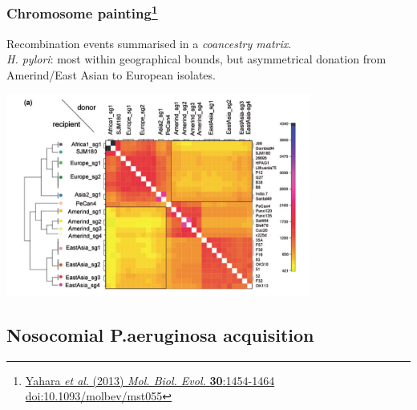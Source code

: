 \begin{frame}
  \frametitle{Chromosome painting\footnote{\tiny{\href{http://dx.doi.org/10.1093/molbev/mst055}{Yahara \textit{et al}. (2013) \textit{Mol. Biol. Evol.} \textbf{30}:1454-1464 doi:10.1093/molbev/mst055}}}}
  Recombination events summarised in a \textit{coancestry matrix}.\\
  \textit{H. pylori}: most within geographical bounds, but asymmetrical donation from Amerind/East Asian to European isolates.
  \begin{center}
    \includegraphics[width=0.75\textwidth]{images/coancestry}
  \end{center}     
\end{frame}

\subsection{Nosocomial P.aeruginosa acquisition}

